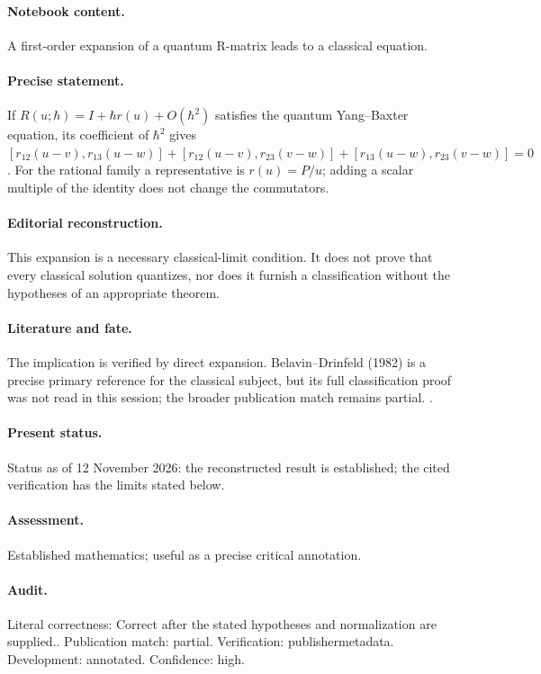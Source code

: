 \paragraph{Notebook content.} A first-order expansion of a quantum R-matrix leads to a classical equation.

\paragraph{Precise statement.} If $R(u;\hbar)=I+\hbar r(u)+O(\hbar^2)$ satisfies the quantum Yang--Baxter equation, its coefficient of $\hbar^2$ gives $[r_{12}(u-v),r_{13}(u-w)]+[r_{12}(u-v),r_{23}(v-w)]+[r_{13}(u-w),r_{23}(v-w)]=0$. For the rational family a representative is $r(u)=P/u$; adding a scalar multiple of the identity does not change the commutators.

\paragraph{Editorial reconstruction.} This expansion is a necessary classical-limit condition. It does not prove that every classical solution quantizes, nor does it furnish a classification without the hypotheses of an appropriate theorem.

\paragraph{Literature and fate.} The implication is verified by direct expansion. Belavin--Drinfeld (1982) is a precise primary reference for the classical subject, but its full classification proof was not read in this session; the broader publication match remains partial. \citep{belavindrinfeld1982classical,belavin1980discrete}.

\paragraph{Present status.} Status as of 12 November 2026: the reconstructed result is established; the cited verification has the limits stated below.

\paragraph{Assessment.} Established mathematics; useful as a precise critical annotation.

\paragraph{Audit.} Literal correctness: Correct after the stated hypotheses and normalization are supplied.. Publication match: partial. Verification: publishermetadata. Development: annotated. Confidence: high.

